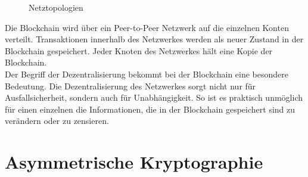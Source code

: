     \begin{figure}[htbp]
    \caption{Netztopologien} 
    \label{net}
    \end{figure}
		
		Die Blockchain wird über ein Peer-to-Peer Netzwerk auf die einzelnen Konten verteilt. Transaktionen innerhalb des Netzwerkes werden als neuer Zustand in der Blockchain gespeichert. Jeder Knoten des Netzwerkes hält eine Kopie der Blockchain. \\
		Der Begriff der Dezentralisierung bekommt bei der Blockchain eine besondere Bedeutung. Die Dezentralisierung des Netzwerkes sorgt nicht nur für Ausfallsicherheit, sondern auch für Unabhängigkeit. So ist es praktisch unmöglich für einen einzelnen die Informationen, die in der Blockchain gespeichert sind zu verändern oder zu zensieren.
		
	
	\section{Asymmetrische Kryptographie}
		
